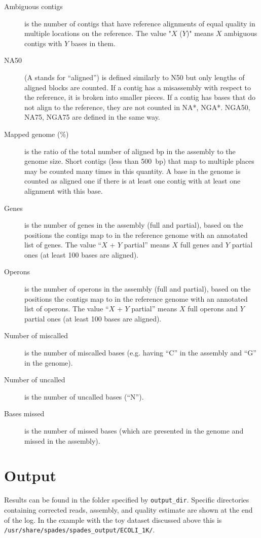 \documentclass{article}
\begin{document}
\begin{description}
\item[Ambiguous contigs] is the number of contigs that have reference alignments
of equal quality in multiple locations on the reference.
The value "$X$ ($Y$)" means $X$ ambiguous contigs with $Y$ bases in them.

\item[NA50] (A stands for ``aligned'') is 
defined similarly to N50 but only
lengths of aligned blocks are counted.
If a contig has a misassembly with respect to the reference, it is broken into smaller pieces.
If a contig has bases that do not align to the reference, they are not counted
in NA*, NGA*. NGA50, NA75, NGA75 are defined in the same way.

\item[Mapped genome (\%)] is the ratio of the total number of aligned bp in the assembly
to the genome size.  Short contigs (less than 500~bp) that map to multiple
places may be counted many times in this quantity.  A base in the genome is
counted as aligned one if there is at least one contig with at least one
alignment with this base.

\item[Genes] is the number of genes in the assembly (full and partial), based
on the positions the contigs map to in the reference genome with an annotated
list of genes. The value ``$X$ + $Y$ partial'' means $X$ full genes and $Y$ partial ones
(at least 100 bases are aligned).

\item[Operons] is the number of operons in the assembly (full and partial),
based on the positions the contigs map to in the reference genome with an annotated list of operons.
The value ``$X$ + $Y$ partial'' means $X$ full operons and $Y$ partial ones (at least 100 bases are aligned).

\item[Number of miscalled] is the number of miscalled bases (e.g. having ``C'' in the assembly and ``G'' in the genome).

\item[Number of uncalled] is the number of uncalled bases (``N'').

\item[Bases missed] is the number of missed bases (which are presented in the genome and missed in the assembly).

\end{description}

\section{Output}
Results can be found in the folder specified by {\tt output\_dir}.
Specific directories containing corrected reads, assembly, and quality estimate are shown at the end of the log. In the example with the toy dataset discussed above this is 
{\tt /usr/share/spades/spades\_output/ECOLI\_1K/}.
\end{document}
